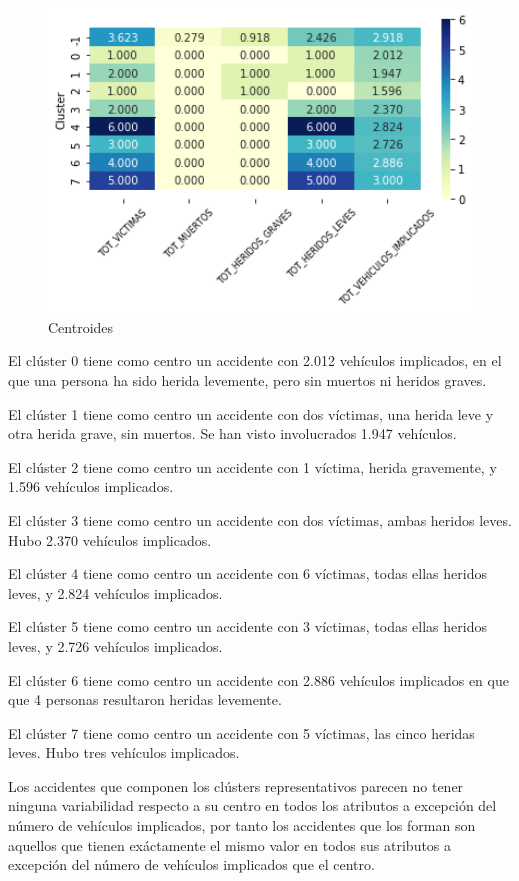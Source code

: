 \documentclass[a4]{article}
\begin{document}
\begin{figure}[H]
  \centering
  \caption{Centroides}
  \includegraphics[width=130mm]{imagenes/c2_dbscan_centroides}
\end{figure}

El clúster 0 tiene como centro un accidente con 2.012 vehículos implicados, en el que una persona ha sido herida levemente, pero sin muertos ni heridos graves.

El clúster 1 tiene como centro un accidente con dos víctimas, una herida leve y otra herida grave, sin muertos. Se han visto involucrados 1.947 vehículos.

El clúster 2 tiene como centro un accidente con 1 víctima, herida gravemente, y 1.596 vehículos implicados.

El clúster 3 tiene como centro un accidente con dos víctimas, ambas heridos leves. Hubo 2.370 vehículos implicados.

El clúster 4 tiene como centro un accidente con 6 víctimas, todas ellas heridos leves, y 2.824 vehículos implicados.

El clúster 5 tiene como centro un accidente con 3 víctimas, todas ellas heridos leves, y 2.726 vehículos implicados.

El clúster 6 tiene como centro un accidente con 2.886 vehículos implicados en que que 4 personas resultaron heridas levemente.

El clúster 7 tiene como centro un accidente con 5 víctimas, las cinco heridas leves. Hubo tres vehículos implicados.

Los accidentes que componen los clústers representativos parecen no tener ninguna variabilidad respecto a su centro en todos los atributos a excepción del número de vehículos implicados, por tanto los accidentes que los forman son aquellos que tienen exáctamente el mismo valor en todos sus atributos a excepción del número de vehículos implicados que el centro.
\end{document}
